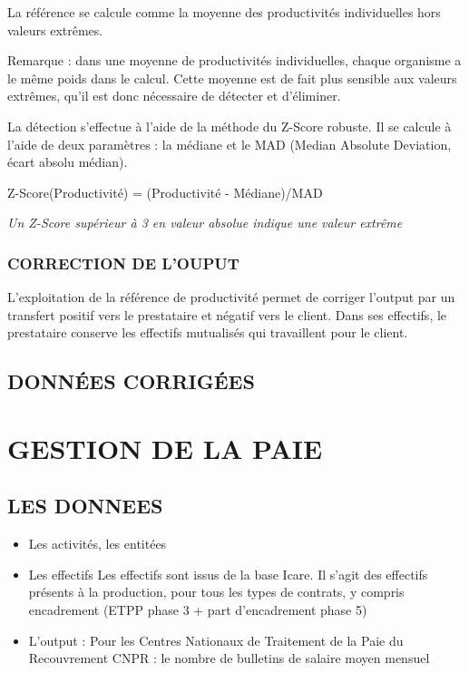 \documentclass[
]{book}
\begin{document}
La référence se calcule comme la moyenne des productivités individuelles hors valeurs extrêmes.

Remarque : dans une moyenne de productivités individuelles, chaque organisme a le même poids dans le calcul. Cette moyenne est de fait plus sensible aux valeurs extrêmes, qu'il est donc nécessaire de détecter et d'éliminer.

La détection s'effectue à l'aide de la méthode du Z-Score robuste.
Il se calcule à l'aide de deux paramètres : la médiane et le MAD (Median Absolute Deviation, écart absolu médian).

Z-Score(Productivité) = (Productivité - Médiane)/MAD

\emph{Un Z-Score supérieur à 3 en valeur absolue indique une valeur extrême}

\hypertarget{correction-de-louput-4}{%
\subsection{CORRECTION DE L'OUPUT}\label{correction-de-louput-4}}

L'exploitation de la référence de productivité permet de corriger l'output par un transfert positif vers le prestataire et négatif vers le client.
Dans ses effectifs, le prestataire conserve les effectifs mutualisés qui travaillent pour le client.

\hypertarget{donnuxe9es-corriguxe9es-4}{%
\section{DONNÉES CORRIGÉES}\label{donnuxe9es-corriguxe9es-4}}

\hypertarget{gestion-de-la-paie}{%
\chapter{GESTION DE LA PAIE}\label{gestion-de-la-paie}}

\hypertarget{les-donnees-16}{%
\section{LES DONNEES}\label{les-donnees-16}}

\begin{itemize}
\item
  Les activités, les entitées
\item
  Les effectifs
  Les effectifs sont issus de la base Icare.
  Il s'agit des effectifs présents à la production, pour tous les types de contrats, y compris encadrement (ETPP phase 3 + part d'encadrement phase 5)
\item
  L'output :
  Pour les Centres Nationaux de Traitement de la Paie du Recouvrement CNPR : le nombre de bulletins de salaire moyen mensuel
\end{itemize}
\end{document}
